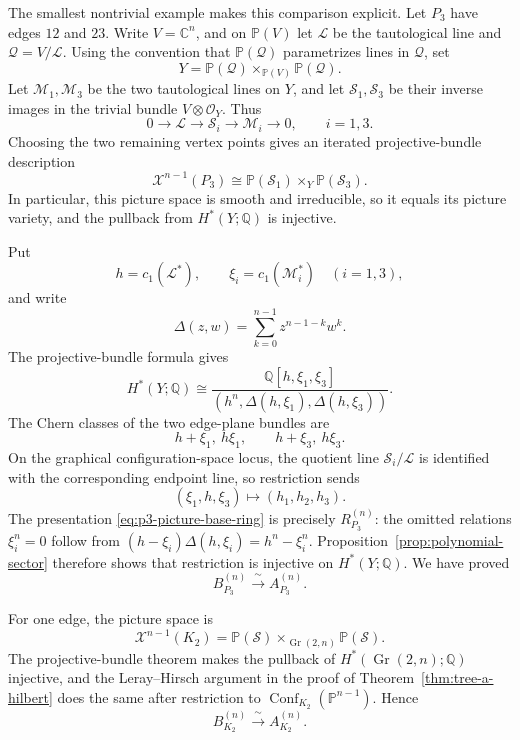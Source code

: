 \documentclass[11pt]{amsart}
\theoremstyle{plain}
\theoremstyle{definition}
\theoremstyle{remark}
\newcommand{\Q}{\mathbb{Q}}
\newcommand{\C}{\mathbb{C}}
\newcommand{\PP}{\mathbb{P}}
\newcommand{\Conf}{\operatorname{Conf}}
\newcommand{\Gr}{\operatorname{Gr}}
\begin{document}
The smallest nontrivial example makes this comparison explicit.  Let
$P_3$ have edges $12$ and $23$.  Write $V=\C^n$, and on $\PP(V)$ let
$\mathcal L$ be the tautological line and $\mathcal Q=V/\mathcal L$.  Using
the convention that $\PP(\mathcal Q)$ parametrizes lines in $\mathcal Q$, set
\[
  Y=\PP(\mathcal Q)\times_{\PP(V)}\PP(\mathcal Q).
\]
Let $\mathcal M_1,\mathcal M_3$ be the two tautological lines on $Y$, and let
$\mathcal S_1,\mathcal S_3$ be their inverse images in the trivial bundle
$V\otimes\mathcal O_Y$.  Thus
\[
  0\longrightarrow\mathcal L\longrightarrow\mathcal S_i
  \longrightarrow\mathcal M_i\longrightarrow0,
  \qquad i=1,3.
\]
Choosing the two remaining vertex points gives an iterated projective-bundle
description
\begin{equation}\label{eq:p3-picture-bundle}
  \mathcal X^{n-1}(P_3)
  \cong\PP(\mathcal S_1)\times_Y\PP(\mathcal S_3).
\end{equation}
In particular, this picture space is smooth and irreducible, so it equals its
picture variety, and the pullback from $H^*(Y;\Q)$ is injective.

Put
\[
  h=c_1(\mathcal L^*),\qquad
  \xi_i=c_1(\mathcal M_i^*)\quad(i=1,3),
\]
and write
\[
  \Delta(z,w)=\sum_{k=0}^{n-1}z^{n-1-k}w^k.
\]
The projective-bundle formula gives
\begin{equation}\label{eq:p3-picture-base-ring}
  H^*(Y;\Q)
  \cong
  \frac{\Q[h,\xi_1,\xi_3]}
  {(h^n,\Delta(h,\xi_1),\Delta(h,\xi_3))}.
\end{equation}
The Chern classes of the two edge-plane bundles are
\[
  h+\xi_1,\ h\xi_1,
  \qquad
  h+\xi_3,\ h\xi_3.
\]
On the graphical configuration-space locus, the quotient line
$\mathcal S_i/\mathcal L$ is identified with the corresponding endpoint line,
so restriction sends
\[
  (\xi_1,h,\xi_3)\longmapsto(h_1,h_2,h_3).
\]
The presentation \eqref{eq:p3-picture-base-ring} is precisely
$R_{P_3}^{(n)}$: the omitted relations $\xi_i^n=0$ follow from
$(h-\xi_i)\Delta(h,\xi_i)=h^n-\xi_i^n$.  Proposition~\ref{prop:polynomial-sector}
therefore shows that restriction is injective on $H^*(Y;\Q)$.  We have proved
\begin{equation}\label{eq:p3-picture-edge-isomorphism}
  B_{P_3}^{(n)}\xrightarrow{\ \sim\ }A_{P_3}^{(n)}.
\end{equation}

For one edge, the picture space is
\[
  \mathcal X^{n-1}(K_2)
  =\PP(\mathcal S)\times_{\Gr(2,n)}\PP(\mathcal S).
\]
The projective-bundle theorem makes the pullback of
$H^*(\Gr(2,n);\Q)$ injective, and the Leray--Hirsch argument in the proof of
Theorem~\ref{thm:tree-a-hilbert} does the same after restriction to
$\Conf_{K_2}(\PP^{n-1})$.  Hence
\begin{equation}\label{eq:k2-picture-edge-isomorphism}
  B_{K_2}^{(n)}\xrightarrow{\ \sim\ }A_{K_2}^{(n)}.
\end{equation}
\end{document}
